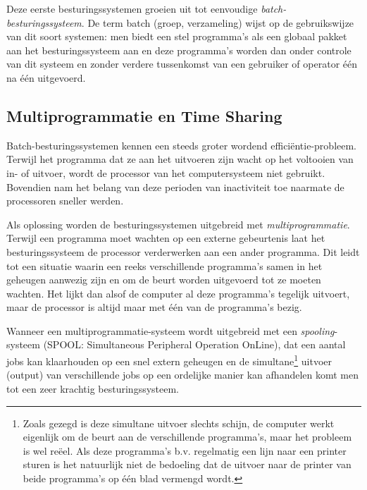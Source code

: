 Deze eerste besturingssystemen groeien uit tot eenvoudige
\emph{batch-besturingssysteem}. De term batch (groep,
verzameling) wijst op de gebruikswijze van dit soort systemen: men
biedt een stel programma's als een globaal pakket aan het
besturingssysteem aan en deze programma's worden dan onder controle
van dit systeem en zonder verdere tussenkomst van een gebruiker of
operator \'e\'en na \'e\'en uitgevoerd.

\subsection{Multiprogrammatie en Time Sharing}

Batch-besturingssystemen kennen een steeds groter wordend
effici\"entie-probleem. Terwijl het programma dat ze aan het uitvoeren
zijn wacht op het voltooien van in- of uitvoer, wordt de processor van
het computersysteem niet gebruikt. Bovendien nam het belang van deze
perioden van inactiviteit toe naarmate de processoren sneller
werden.

Als oplossing worden de besturingssystemen uitgebreid met
\emph{multiprogrammatie}. Terwijl een programma moet
wachten op een externe gebeurtenis laat het besturingssysteem de
processor verderwerken aan een ander programma. Dit leidt tot een
situatie waarin een reeks verschillende programma's samen in het
geheugen aanwezig zijn en om de beurt worden uitgevoerd tot ze moeten
wachten. Het lijkt dan alsof de computer al deze programma's tegelijk
uitvoert, maar de processor is altijd maar met \'e\'en van de programma's
bezig.

Wanneer een multiprogrammatie-systeem wordt uitgebreid met een
\emph{spooling}-systeem (SPOOL: Simultaneous
Peripheral Operation OnLine), dat een aantal jobs kan klaarhouden op
een snel extern geheugen en de simultane\footnote{Zoals gezegd is deze simultane
uitvoer slechts schijn, de computer werkt eigenlijk om de beurt aan de
verschillende programma's, maar het probleem is wel re\"eel. Als deze
programma's b.v. regelmatig een lijn naar een printer sturen is het natuurlijk
niet de bedoeling dat de uitvoer naar de printer van beide programma's op
\'e\'en blad vermengd wordt.} uitvoer (output) van verschillende jobs op een
ordelijke manier kan afhandelen komt men tot een zeer krachtig
besturingssysteem.

